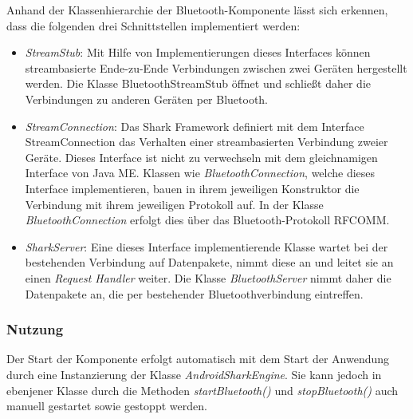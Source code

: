 \label{ch:bluetoothinterfaces}
Anhand der Klassenhierarchie der Bluetooth-Komponente lässt sich erkennen, dass die folgenden drei Schnittstellen implementiert werden:
\begin{itemize}
	\item \textit{StreamStub}: Mit Hilfe von Implementierungen dieses Interfaces können streambasierte Ende-zu-Ende Verbindungen zwischen zwei Geräten hergestellt werden. Die Klasse BluetoothStreamStub öffnet und schließt daher die Verbindungen zu anderen Geräten per Bluetooth.
	\item \textit{StreamConnection}: Das Shark Framework definiert mit dem Interface StreamConnection das Verhalten einer streambasierten Verbindung zweier Geräte. Dieses Interface ist nicht zu verwechseln mit dem gleichnamigen Interface von Java ME. Klassen wie \textit{BluetoothConnection}, welche dieses Interface implementieren, bauen in ihrem jeweiligen Konstruktor die Verbindung mit ihrem jeweiligen Protokoll auf. In der Klasse \textit{BluetoothConnection} erfolgt dies über das Bluetooth-Protokoll RFCOMM.
	\item \textit{SharkServer}: Eine dieses Interface implementierende Klasse wartet bei der bestehenden Verbindung auf Datenpakete, nimmt diese an und leitet sie an einen \textit{Request Handler} weiter. Die Klasse \textit{BluetoothServer} nimmt daher die Datenpakete an, die per bestehender Bluetoothverbindung eintreffen.

\end{itemize}

\subsubsection{Nutzung}
Der Start der Komponente erfolgt automatisch mit dem Start der Anwendung durch eine Instanzierung der Klasse \textit{AndroidSharkEngine}. Sie kann jedoch in ebenjener Klasse durch die Methoden \textit{startBluetooth()} und \textit{stopBluetooth()} auch manuell gestartet sowie gestoppt werden.

